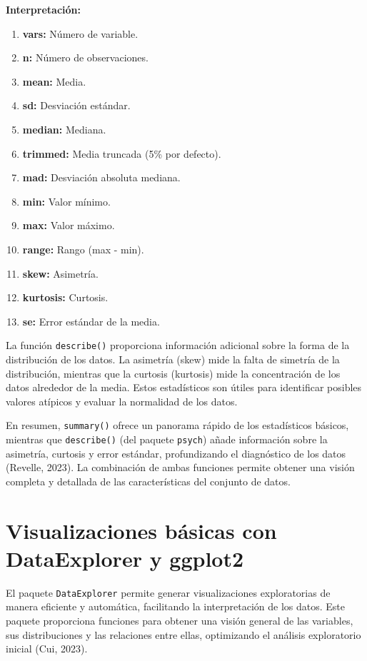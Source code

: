 \documentclass[
  spanish,
  a4paper,
  DIV=11,
  numbers=noendperiod,
  onepage,
  openany]{scrreprt}
\begin{document}
\textbf{Interpretación:}

\begin{enumerate}
\def\labelenumi{\arabic{enumi}.}
\item
  \textbf{vars:} Número de variable.
\item
  \textbf{n:} Número de observaciones.
\item
  \textbf{mean:} Media.
\item
  \textbf{sd:} Desviación estándar.
\item
  \textbf{median:} Mediana.
\item
  \textbf{trimmed:} Media truncada (5\% por defecto).
\item
  \textbf{mad:} Desviación absoluta mediana.
\item
  \textbf{min:} Valor mínimo.
\item
  \textbf{max:} Valor máximo.
\item
  \textbf{range:} Rango (max - min).
\item
  \textbf{skew:} Asimetría.
\item
  \textbf{kurtosis:} Curtosis.
\item
  \textbf{se:} Error estándar de la media.
\end{enumerate}

La función \texttt{describe()} proporciona información adicional sobre
la forma de la distribución de los datos. La asimetría (skew) mide la
falta de simetría de la distribución, mientras que la curtosis
(kurtosis) mide la concentración de los datos alrededor de la media.
Estos estadísticos son útiles para identificar posibles valores atípicos
y evaluar la normalidad de los datos.

En resumen, \texttt{summary()} ofrece un panorama rápido de los
estadísticos básicos, mientras que \texttt{describe()} (del paquete
\texttt{psych}) añade información sobre la asimetría, curtosis y error
estándar, profundizando el diagnóstico de los datos (Revelle, 2023). La
combinación de ambas funciones permite obtener una visión completa y
detallada de las características del conjunto de datos.

\section{Visualizaciones básicas con DataExplorer y
ggplot2}\label{visualizaciones-buxe1sicas-con-dataexplorer-y-ggplot2}

El paquete \texttt{DataExplorer} permite generar visualizaciones
exploratorias de manera eficiente y automática, facilitando la
interpretación de los datos. Este paquete proporciona funciones para
obtener una visión general de las variables, sus distribuciones y las
relaciones entre ellas, optimizando el análisis exploratorio inicial
(Cui, 2023).
\end{document}
